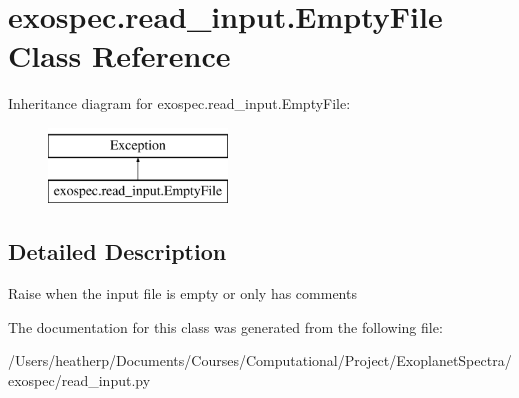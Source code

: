 \hypertarget{classexospec_1_1read__input_1_1_empty_file}{}\section{exospec.\+read\+\_\+input.\+Empty\+File Class Reference}
\label{classexospec_1_1read__input_1_1_empty_file}
Inheritance diagram for exospec.\+read\+\_\+input.\+Empty\+File\+:\begin{figure}[H]
\begin{center}
\leavevmode
\includegraphics[height=2.000000cm]{classexospec_1_1read__input_1_1_empty_file}
\end{center}
\end{figure}


\subsection{Detailed Description}
\begin{DoxyVerb}Raise when the input file is empty or only has comments\end{DoxyVerb}
 

The documentation for this class was generated from the following file\+:\begin{DoxyCompactItemize}
\item 
/\+Users/heatherp/\+Documents/\+Courses/\+Computational/\+Project/\+Exoplanet\+Spectra/exospec/read\+\_\+input.\+py\end{DoxyCompactItemize}
